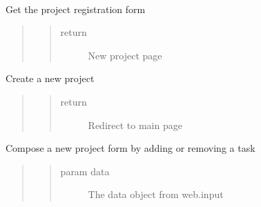 \documentclass[letterpaper,10pt,english]{sphinxmanual}
\begin{document}
\begin{fulllineitems}
\label{\detokenize{index:views.new_project.New_project}}~

\begin{fulllineitems}
\label{\detokenize{index:views.new_project.New_project.GET}}
Get the project registration form
\begin{quote}
\begin{quote}\begin{description}
\item[{return}] \leavevmode
New project page

\end{description}\end{quote}
\end{quote}

\end{fulllineitems}


\begin{fulllineitems}
\label{\detokenize{index:views.new_project.New_project.POST}}
Create a new project
\begin{quote}
\begin{quote}\begin{description}
\item[{return}] \leavevmode
Redirect to main page

\end{description}\end{quote}
\end{quote}

\end{fulllineitems}


\begin{fulllineitems}
\label{\detokenize{index:views.new_project.New_project.compose_form}}
Compose a new project form by adding or removing a task
\begin{quote}
\begin{quote}\begin{description}
\item[{param data}] \leavevmode
The data object from web.input


\end{description}
\end{quote}
\end{quote}
\end{fulllineitems}
\end{fulllineitems}
\end{document}
